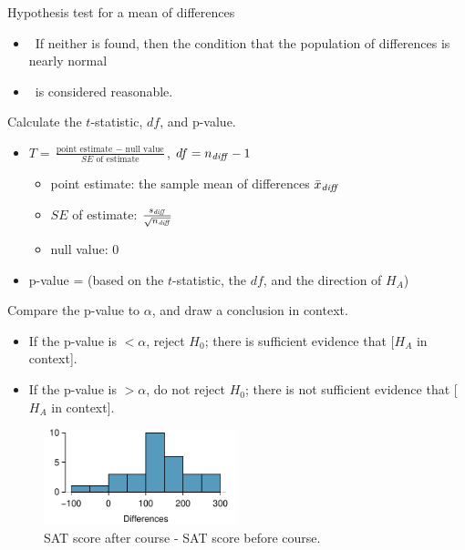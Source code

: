 \begin{onebox}{Hypothesis test for a mean of differences}
\begin{itemize}
\item[] \quad \ If neither is found, then the condition that the population of differences is nearly normal 
\item[] \quad \ is considered reasonable.  
\end{itemize}
   Calculate the $t$-statistic, $df$, and p-value.
\begin{itemize}
\item[] $T = \frac{\text{point estimate } - \text{ null value}}{SE \text{ of estimate}}$,  \quad $df=n_{\text{\emph{diff}}} -1$
\begin{itemize}
\item[] point estimate: the sample mean of differences $\bar{x}_{\text{\emph{diff}}} $
\item[] $SE$ of estimate:  $\frac{s_{\text{\emph{diff}}} }{\sqrt{n_{\text{\emph{diff}}} }}$
\item[] null value: $0$
\end{itemize}
\item[] p-value = (based on the $t$-statistic, the $df$, and the direction of $H_A$)
\end{itemize}
  Compare the p-value to $\alpha$, and draw a conclusion in context.\vspace{-1mm}
\begin{itemize}
\item[] If the p-value is $< \alpha$, reject $H_0$; there is sufficient evidence that [$H_A$ in context]. 
\item[] If the p-value is $> \alpha$, do not reject $H_0$; there is not sufficient evidence that [$H_A$ in context].
\end{itemize}\end{onebox}



\begin{figure}[h]
\centering
\includegraphics[width=0.5\textwidth]{ch_inference_for_means/figures/satImprovementHTDataHistogram/satImprovementHTDataHistogram}
\caption{SAT score after course - SAT score before course. }
\label{satImprovementHTDataHistogramrepeat}
\end{figure}

